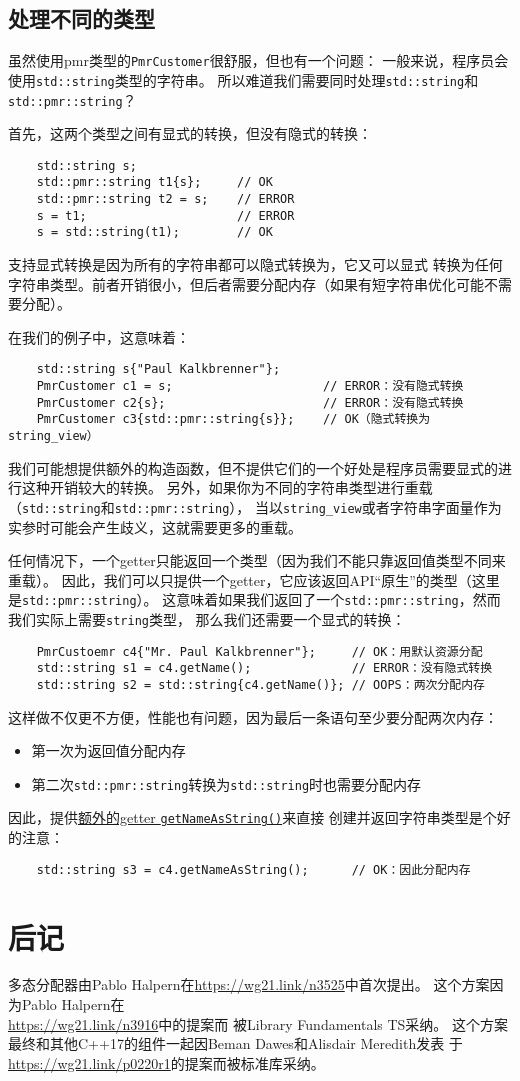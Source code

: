 \subsection{处理不同的类型}
虽然使用pmr类型的\texttt{PmrCustomer}很舒服，但也有一个问题：
一般来说，程序员会使用\texttt{std::string}类型的字符串。
所以难道我们需要同时处理\texttt{std::string}和\texttt{std::pmr::string}？

首先，这两个类型之间有显式的转换，但没有隐式的转换：
\begin{lstlisting}
    std::string s;
    std::pmr::string t1{s};     // OK
    std::pmr::string t2 = s;    // ERROR
    s = t1;                     // ERROR
    s = std::string(t1);        // OK
\end{lstlisting}
支持显式转换是因为所有的字符串都可以隐式转换为，它又可以显式
转换为任何字符串类型。前者开销很小，但后者需要分配内存（如果有短字符串优化可能不需要分配）。

在我们的例子中，这意味着：
\begin{lstlisting}
    std::string s{"Paul Kalkbrenner"};
    PmrCustomer c1 = s;                     // ERROR：没有隐式转换
    PmrCustomer c2{s};                      // ERROR：没有隐式转换
    PmrCustomer c3{std::pmr::string{s}};    // OK（隐式转换为string_view）
\end{lstlisting}
我们可能想提供额外的构造函数，但不提供它们的一个好处是程序员需要显式的进行这种开销较大的转换。
另外，如果你为不同的字符串类型进行重载（\texttt{std::string}和\texttt{std::pmr::string}），
当以\texttt{string\_view}或者字符串字面量作为实参时可能会产生歧义，这就需要更多的重载。

任何情况下，一个getter只能返回一个类型（因为我们不能只靠返回值类型不同来重载）。
因此，我们可以只提供一个getter，它应该返回API“原生”的类型（这里是\texttt{std::pmr::string}）。
这意味着如果我们返回了一个\texttt{std::pmr::string}，然而我们实际上需要\texttt{string}类型，
那么我们还需要一个显式的转换：\label{pmr转换}
\begin{lstlisting}
    PmrCustoemr c4{"Mr. Paul Kalkbrenner"};     // OK：用默认资源分配
    std::string s1 = c4.getName();              // ERROR：没有隐式转换
    std::string s2 = std::string{c4.getName()}; // OOPS：两次分配内存
\end{lstlisting}
这样做不仅更不方便，性能也有问题，因为最后一条语句至少要分配两次内存：
\begin{itemize}
    \item 第一次为返回值分配内存
    \item 第二次\texttt{std::pmr::string}转换为\texttt{std::string}时也需要分配内存
\end{itemize}
因此，提供\hyperref[ch29.3.1]{额外的getter \texttt{getNameAsString()}}来直接
创建并返回字符串类型是个好的注意：
\begin{lstlisting}
    std::string s3 = c4.getNameAsString();      // OK：因此分配内存
\end{lstlisting}

\section{后记}
多态分配器由Pablo Halpern在\url{https://wg21.link/n3525}中首次提出。
这个方案因为Pablo Halpern在\\
\url{https://wg21.link/n3916}中的提案而
被Library Fundamentals TS采纳。
这个方案最终和其他C++17的组件一起因Beman Dawes和Alisdair Meredith发表
于\url{https://wg21.link/p0220r1}的提案而被标准库采纳。


